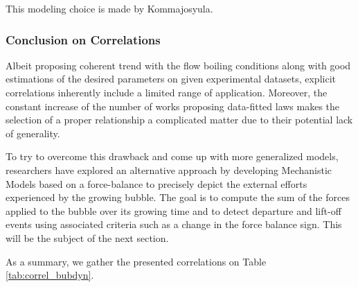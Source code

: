 \begin{note*}{}
This modeling choice is made by Kommajosyula.
\end{note*}

\subsubsection{Conclusion on Correlations}

Albeit proposing coherent trend with the flow boiling conditions along with good estimations of the desired parameters on given experimental datasets, explicit correlations inherently include a limited range of application. Moreover, the constant increase of the number of works proposing data-fitted laws makes the selection of a proper relationship a complicated matter due to their potential lack of generality.

\npar

To try to overcome this drawback and come up with more generalized models, researchers have explored an alternative approach by developing Mechanistic Models based on a force-balance to precisely depict the external efforts experienced by the growing bubble. The goal is to compute the sum of the forces applied to the bubble over its growing time and to detect departure and lift-off events using associated criteria such as a change in the force balance sign. This will be the subject of the next section.

\npar

As a summary, we gather the presented correlations on Table \ref{tab:correl_bubdyn}.


